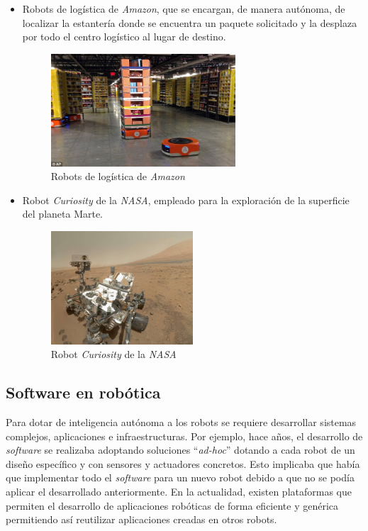 \begin{itemize}
    \item Robots de logística de \textit{Amazon}, que se encargan, de manera autónoma, de localizar la estantería donde se encuentra un paquete solicitado y la desplaza por todo el centro logístico al lugar de destino.
        \begin{figure}[H]
    \centering
    \includegraphics[width=0.65\textwidth]{img/robots-amazon.jpg}
    \caption{Robots de logística de \textit{Amazon}} \label{fig:amazon}
    \end{figure}
    \item Robot \textit{Curiosity} de la \textit{NASA}, empleado para la exploración de la superficie del planeta Marte.
    \begin{figure}[H]
    \centering
    \includegraphics[width=0.5\textwidth]{img/curiosity.jpg}
    \caption{Robot \textit{Curiosity} de la \textit{NASA}} \label{fig:curiosity}
    \end{figure}
\end{itemize}{}

\subsection{Software en robótica}
\label{subsec:softwarerobot}
Para dotar de inteligencia autónoma a los robots se requiere desarrollar sistemas  complejos, aplicaciones e infraestructuras. Por ejemplo, hace años, el desarrollo de \textit{software} se realizaba adoptando soluciones ``\textit{ad-hoc}'' dotando a cada robot de un diseño específico y con sensores y actuadores concretos. Esto implicaba que había que implementar todo el \textit{software} para un nuevo robot debido a que no se podía aplicar el desarrollado anteriormente. En la actualidad, existen plataformas que permiten el desarrollo de aplicaciones robóticas de forma eficiente y genérica permitiendo así reutilizar aplicaciones creadas en otros robots. \\


